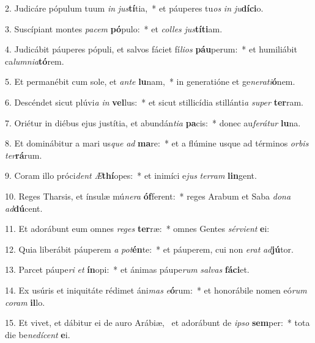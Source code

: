 2. Judicáre pópulum tuum \textit{in} \textit{jus}\textbf{tí}tia,~*  et páuperes tu\textit{os} \textit{in} \textit{ju}\textbf{dí}\textbf{ci}o.\

3. Suscípiant montes \textit{pa}\textit{cem} \textbf{pó}pulo:~*  et \textit{col}\textit{les} \textit{jus}\textbf{tí}\textbf{ti}am.\

4. Judicábit páuperes pópuli, et salvos fáciet fí\textit{li}\textit{os} \textbf{páu}perum:~*  et humiliábit ca\textit{lum}\textit{ni}\textit{a}\textbf{tó}rem.\

5. Et permanébit cum sole, et \textit{an}\textit{te} \textbf{lu}nam,~*  in generatióne et ge\textit{ne}\textit{ra}\textit{ti}\textbf{ó}nem.\

6. Descéndet sicut plúvi\textit{a} \textit{in} \textbf{vel}lus:~*  et sicut stillicídia stillánti\textit{a} \textit{su}\textit{per} \textbf{ter}ram.\

7. Oriétur in diébus ejus justítia, et abundán\textit{ti}\textit{a} \textbf{pa}cis:~*  donec au\textit{fe}\textit{rá}\textit{tur} \textbf{lu}na.\

8. Et dominábitur a mari us\textit{que} \textit{ad} \textbf{ma}re:~*  et a flúmine usque ad términos \textit{or}\textit{bis} \textit{ter}\textbf{rá}rum.\

9. Coram illo próci\textit{dent} \textit{Æ}\textbf{thí}opes:~*  et inimíci e\textit{jus} \textit{ter}\textit{ram} \textbf{lin}gent.\

10. Reges Tharsis, et ínsulæ mú\textit{ne}\textit{ra} \textbf{óf}ferent:~*  reges Arabum et Saba \textit{do}\textit{na} \textit{ad}\textbf{dú}cent.\

11. Et adorábunt eum omnes \textit{re}\textit{ges} \textbf{ter}ræ:~*  omnes Gentes \textit{sér}\textit{vi}\textit{ent} \textbf{e}i:\

12. Quia liberábit páuperem \textit{a} \textit{pot}\textbf{én}te:~*  et páuperem, cui non \textit{e}\textit{rat} \textit{ad}\textbf{jú}tor.\

13. Parcet páupe\textit{ri} \textit{et} \textbf{ín}opi:~*  et ánimas páupe\textit{rum} \textit{sal}\textit{vas} \textbf{fá}\textbf{ci}et.\

14. Ex usúris et iniquitáte rédimet áni\textit{mas} \textit{e}\textbf{ó}rum:~*  et honorábile nomen eó\textit{rum} \textit{co}\textit{ram} \textbf{il}lo.\

15. Et vivet, et dábitur ei de auro Arábiæ, \dag\  et adorábunt de \textit{ip}\textit{so} \textbf{sem}per:~*  tota die be\textit{ne}\textit{dí}\textit{cent} \textbf{e}i.\

